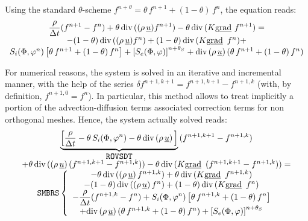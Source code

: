 Using the standard $\theta$-scheme $f^{n+\theta}=\theta\,f^{n+1}+(1-\theta)%
\,f^{n}$, the equation reads:
\begin{equation}
\begin{array}{c}
\displaystyle \frac{\rho}{\Delta t}(f^{n+1}-f^{n})+ \theta\,\dive\,((\rho\,%
\underline{u}) f^{n+1})-\theta\, \dive\,(K \grad f^{n+1}) = \\
- (1-\theta)\,\dive\,((\rho\,\underline{u}) f^{n})+(1-\theta)\,\dive\,(K %
\grad \,f^{n}) + \\
S_{i}(\Phi,\varphi^n)\left[\theta\,f^{n+1}+(1-\theta)\,f^{n}\right] + \left[%
S_{e}(\Phi,\varphi)\right]^{n+\theta_{S}} + \dive\,(\rho\,\underline{u}%
)\,(\theta\,f^{n+1}+(1-\theta)\,f^{n})%
\end{array}%
\end{equation}

For numerical reasons, the system is solved in an iterative and incremental
manner, with the help of the series $\delta f^{n+1,k+1}=f^{n+1,k+1}-f^{n+1,k}
$ (with, by definition, $f^{n+1,0}=f^{n}$). In particular, this method
allows to treat implicitly a portion of the advection-diffusion terms
associated correction terms for non orthogonal meshes. Hence, the system
actually solved reads:
\begin{equation}
\begin{array}{c}
\displaystyle\underbrace{\left[ \frac{\rho }{\Delta t}-\theta \,S_{i}(\Phi
,\varphi ^{n})-\theta \,\dive\,(\rho \,\underline{u})\,\right] }_{%
\displaystyle\var{ROVSDT}}\,(f^{n+1,k+1}-f^{n+1,k}) \\
+\theta \,\dive\,((\rho \,\underline{u})\,(f^{n+1,k+1}-f^{n+1,k}))-\theta \,%
\dive\,(K\grad\,(f^{n+1,k+1}-f^{n+1,k}))= \\
\var{SMBRS}\left\{
\begin{array}{c}
-\theta \,\dive\,((\rho \,\underline{u})\,f^{n+1,k})+\theta \,\dive\,(K\grad%
\,f^{n+1,k}) \\
-(1-\theta )\,\dive\,((\rho \,\underline{u})\,f^{n})+(1-\theta )\,\dive\,(K%
\grad\,f^{n}) \\
\displaystyle-\frac{\rho }{\Delta t}(f^{n+1,k}-f^{n})+S_{i}(\Phi ,\varphi
^{n})\left[ \theta \,f^{n+1,k}+(1-\theta )\,f^{n}\right]  \\
+\dive\,(\rho \,\underline{u})\,(\theta \,f^{n+1,k}+(1-\theta )\,f^{n})+%
\left[ S_{e}(\Phi ,\varphi )\right] ^{n+\theta _{S}}%
\end{array}%
\right.
\end{array}%
\end{equation}

